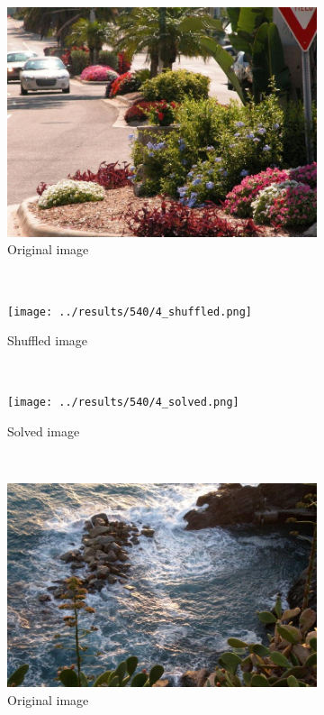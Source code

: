 \documentclass[11pt]{report}
\begin{document}
\begin{figure}
\begin{subfigure}[b]{0.3\textwidth}
		\includegraphics[width=\textwidth]{../imData/540/4.jpg}
		\caption{Original image}
	\end{subfigure}
	~
	\begin{subfigure}[b]{0.3\textwidth}
		\texttt{[image: ../results/540/4\_shuffled.png]}
		\caption{Shuffled image}
	\end{subfigure}
	~
	\begin{subfigure}[b]{0.3\textwidth}
		\texttt{[image: ../results/540/4\_solved.png]}
		\caption{Solved image}
	\end{subfigure}
  ~
  \begin{subfigure}[b]{0.3\textwidth}
		\includegraphics[width=\textwidth]{../imData/805/14.jpg}
		\caption{Original image}
	\end{subfigure}
	~
	\begin{subfigure}[b]{0.3\textwidth}

\end{subfigure}
\end{figure}
\end{document}
